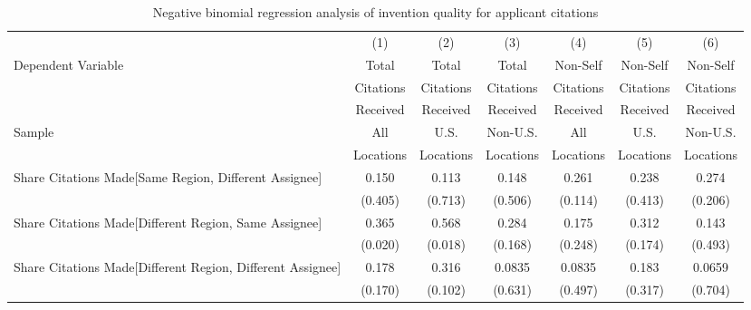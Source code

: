 \begin{table}[htbp]\centering
\caption{Negative binomial regression analysis of invention quality for applicant citations \label{a.model123192021}}
\small
\onehalfspacing
\begin{adjustbox}{angle=90}
\begin{tabular}{l*{6}{c}}
\hline\hline
                &\multicolumn{1}{c}{(1)}&\multicolumn{1}{c}{(2)}&\multicolumn{1}{c}{(3)}&\multicolumn{1}{c}{(4)}&\multicolumn{1}{c}{(5)}&\multicolumn{1}{c}{(6)}\\
 \multirow{3}{*}{Dependent Variable} &\multicolumn{1}{c}{Total}&\multicolumn{1}{c}{Total}&\multicolumn{1}{c}{Total}&\multicolumn{1}{c}{Non-Self}&\multicolumn{1}{c}{Non-Self}&\multicolumn{1}{c}{Non-Self}\\
                &\multicolumn{1}{c}{Citations}&\multicolumn{1}{c}{Citations}&\multicolumn{1}{c}{Citations}&\multicolumn{1}{c}{Citations}&\multicolumn{1}{c}{Citations}&\multicolumn{1}{c}{Citations}\\
                 &\multicolumn{1}{c}{Received}&\multicolumn{1}{c}{Received}&\multicolumn{1}{c}{Received}&\multicolumn{1}{c}{Received}&\multicolumn{1}{c}{Received}&\multicolumn{1}{c}{Received}\\
                 \hline
 \multirow{2}{*}{Sample}&\multicolumn{1}{c}{All}&\multicolumn{1}{c}{U.S.}&\multicolumn{1}{c}{Non-U.S.}&\multicolumn{1}{c}{All}&\multicolumn{1}{c}{U.S.}&\multicolumn{1}{c}{Non-U.S.}\\       
  &\multicolumn{1}{c}{Locations}&\multicolumn{1}{c}{Locations}&\multicolumn{1}{c}{Locations}&\multicolumn{1}{c}{Locations}&\multicolumn{1}{c}{Locations}&\multicolumn{1}{c}{Locations}\\       
\hline
Share Citations Made[Same Region, Different Assignee]&    0.150&    0.113&    0.148&    0.261&    0.238&    0.274\\
                &  (0.405)&  (0.713)&  (0.506)&  (0.114)&  (0.413)&  (0.206)\\
Share Citations Made[Different Region, Same Assignee]&    0.365&    0.568&    0.284&    0.175&    0.312&    0.143\\
                &  (0.020)&  (0.018)&  (0.168)&  (0.248)&  (0.174)&  (0.493)\\
Share Citations Made[Different Region, Different Assignee]&    0.178&    0.316&   0.0835&   0.0835&    0.183&   0.0659\\
                &  (0.170)&  (0.102)&  (0.631)&  (0.497)&  (0.317)&  (0.704)\\

\end{tabular}
\end{adjustbox}
\end{table}
